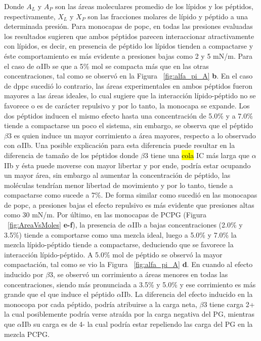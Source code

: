 {Donde $A_{L}$ y $A_{P}$ son las áreas moleculares promedio de los lípidos y los péptidos, respectivamente, $X_{L}$ y $X_{P}$ son las fracciones molares de lípido y péptido a una determinada presión.
Para monocapas de \ac{popc}, en todas las presiones evaluadas los resultados sugieren que ambos péptidos parecen interaccionar atractivamente con lípidos, es decir, en presencia de péptido los lípidos tienden a compactarse y éste comportamiento es más evidente a presiones bajas como 2 y 5 mN/m. Para el caso de $\alpha$IIb se que a 5\% mol se compacta más que en las otras concentraciones, tal como se observó en la Figura ~\ref{fig:alfa_pi_A} \textbf{b}. En el caso de \ac{dppc} sucedió lo contrario, las áreas experimentales en ambos péptidos fueron mayores a las áreas ideales, lo cual sugiere que la interacción lípido-péptido no se favorece o es de carácter repulsivo y por lo tanto, la monocapa se expande. Los dos péptidos inducen el mismo efecto hasta una concentración de 5.0\% y a 7.0\% tiende a compactarse un poco el sistema, sin embargo, se observa que el péptido $\beta$3 es quien induce un mayor corrimiento a área mayores, respecto a lo observado con $\alpha$IIb. Una posible explicación para esta diferencia puede resultar en la diferencia de tamaño de los péptidos donde $\beta$3 tiene una \hl{cola} \ac{IC} más larga que $\alpha$IIb y ésta puede moverse con mayor libertar y por ende, podría estar ocupando un mayor área, sin embargo al aumentar la concentración de péptido, las moléculas tendrían menor libertad de movimiento y por lo tanto, tiende a compactarse como sucede a 7\%. De forma similar como sucedió en las monocapas de \ac{popc}, a presiones bajas el efecto repulsivo es más evidente que presiones altas como 30 mN/m.
Por último, en las monocapas de PCPG (Figura ~\ref{fig:AreaVsMoles} \textbf{e-f}), la presencia de $\alpha$IIb a bajas concentraciones (2.0\% y 3.5\%) tiende a comportarse como una mezcla ideal, luego a 5.0\% y 7.0\% la mezcla lípido-péptido tiende a compactarse, deduciendo que se favorece la interacción lípido-péptido. A 5.0\% mol de péptido se observó la mayor compactación, tal como se vio la Figura ~\ref{fig:alfa_pi_A} \textbf{d}. En cuando al efecto inducido por $\beta$3, se observó un corrimiento a áreas menores en todas las concentraciones, siendo más pronunciada a 3.5\% y 5.0\% y ese corrimiento es más grande que el que induce el péptido $\alpha$IIb. La diferencia del efecto inducido en la monocopa por cada péptido, podría atribuirse a la carga neta, $\beta$3 tiene carga 2+ la cual posiblemente podría verse atraída por la carga negativa del PG, mientras que $\alpha$IIb su carga es de 4- la cual podría estar repeliendo las carga del PG en la mezcla PCPG.

}
